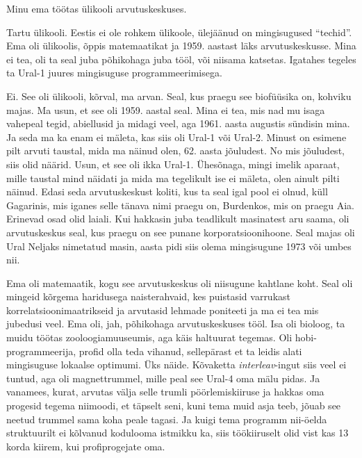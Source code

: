 

Minu ema töötas ülikooli arvutuskeskuses.


Tartu ülikooli. Eestis ei ole rohkem ülikoole,  ülejäänud on mingisugused 
\enquote{techid}. Ema oli ülikoolis, õppis matemaatikat ja 1959. aastast läks 
arvutuskeskusse. Mina ei tea,  oli ta seal juba põhikohaga juba tööl, või 
niisama katsetas. Igatahes tegeles ta Ural-1  juures 
mingisuguse programmeerimisega. 

Ei. See oli ülikooli, kõrval, ma arvan. Seal, kus praegu see biofüüsika on, 
kohviku majas.  Ma usun, et see oli 1959. aastal seal. Mina ei tea, mis nad mu 
isaga  vahepeal tegid,  abiellusid ja midagi veel, aga 1961. aasta augustis 
sündisin mina. Ja seda ma ka enam ei mäleta, kas siis oli Ural-1 või Ural-2. 
Minust on esimene pilt arvuti taustal, mida ma näinud olen, 62. aasta 
jõuludest. No mis jõuludest, siis olid näärid. Usun, et see oli ikka Ural-1. 
Ühesõnaga, mingi imelik aparaat, mille taustal mind näidati ja mida ma 
tegelikult ise ei mäleta, olen ainult pilti näinud. Edasi  seda arvutuskeskust 
koliti, kus ta seal igal pool ei olnud, küll Gagarinis, mis iganes selle tänava 
nimi praegu on, Burdenkos, mis 
on praegu Aia. Erinevad osad olid laiali. Kui hakkasin 
juba  teadlikult masinatest aru saama,  oli arvutuskeskus seal, kus praegu on 
see punane korporatsioonihoone. Seal majas oli Ural Neljaks nimetatud 
masin, aasta pidi siis olema mingisugune 1973 või umbes 
nii. 


Ema oli matemaatik, kogu see arvutuskeskus oli niisugune kahtlane koht. Seal 
oli mingeid kõrgema haridusega naisterahvaid, kes puistasid varrukast  
korrelatsioonimaatrikseid ja arvutasid  lehmade poniteeti ja ma ei tea mis 
jubedusi veel. Ema oli, jah, põhikohaga arvutuskeskuses tööl. Isa oli bioloog, 
ta muidu töötas zooloogiamuuseumis, aga  käis haltuurat tegemas. Oli 
hobi-programmeerija, profid olla teda vihanud, sellepärast et ta leidis alati 
mingisuguse lokaalse optimumi. Üks näide. Kõvaketta \emph{interleav}-ingut siis 
veel ei tuntud, aga oli magnettrummel, mille peal see Ural-4 oma mälu pidas. Ja 
vanamees, kurat, arvutas välja selle trumli pöörlemiskiiruse ja hakkas oma 
progesid tegema niimoodi, et täpselt seni, kuni tema muid asja teeb, jõuab see 
neetud trummel sama koha peale tagasi. Ja kuigi tema programm nii-öelda 
struktuurilt ei kõlvanud kodulooma istmikku ka, siis töökiiruselt olid vist kas 
13 korda kiirem, kui profiprogejate oma.

